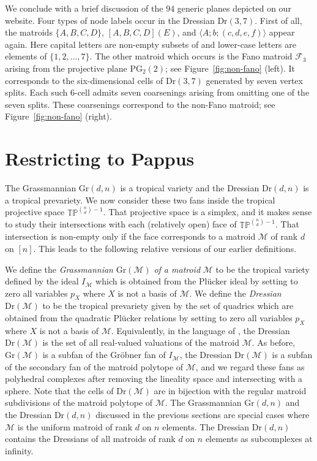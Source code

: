 \documentclass[12pt,a4paper]{amsart}
\theoremstyle{definition}
\newcommand{\PG}{{\mathrm{PG}}}
\newcommand{\Gr}{{\mathrm{Gr}}}
\newcommand{\Dr}{{\mathrm{Dr}}}
\newcommand{\TP}{{\mathbb{TP}}}
\providecommand\cF{{\mathscr{F}}}
\providecommand\cM{{\mathscr{M}}}
\begin{document}
We conclude with a brief discussion of the $94$ generic planes
depicted on our website.  Four types of node labels occur in the
Dressian $\Dr(3,7)$.  First of all, the matroids $\{A,B,C,D\}$,
$[A,B,C,D](E)$, and $\langle A;b;(c,d,e,f)\rangle$ appear again.  Here
capital letters are non-empty subsets of and lower-case letters are
elements of $\{1,2,\ldots,7\}$.  The other matroid which occurs is the
Fano matroid $\cF_3$ arising from the projective plane $\PG_2(2)$; see
Figure~\ref{fig:non-fano} (left).  It corresponds to the
six-dimensional cells of $\Dr(3,7)$ generated by seven vertex splits.
Each such $6$-cell admits seven coarsenings arising from omitting one
of the seven splits.  These coarsenings correspond to the non-Fano
matroid; see Figure~\ref{fig:non-fano} (right).

\section{Restricting to Pappus}
\label{sec:pappus}

The Grassmannian $\Gr(d,n)$ is a tropical variety and the Dressian
$\Dr(d,n)$ is a tropical prevariety.  We now consider these two fans
inside the tropical projective space $\TP^{\binom{n}{d}-1}$.  That
projective space is a simplex, and it makes sense to study their
intersections with each (relatively open) face of
$\TP^{\binom{n}{d}-1}$. That intersection is non-empty only if the
face corresponds to a matroid $\cM$ of rank $d$ on $[n]$. This leads
to the following relative versions of our earlier definitions.

We define the
\emph{Grassmannian} $\Gr(\cM)$ \emph{of a matroid} $\cM$ 
to be the tropical variety
defined by the ideal $I_\cM$ which is obtained from the Pl\"ucker
ideal by setting to zero all variables $p_X$ where $X$ is not a basis of $\cM$.  We define the \emph{Dressian} $\Dr(\cM)$ to be
the tropical prevariety given
by the set of quadrics which are obtained from the quadratic Pl\"ucker
relations by setting to zero all variables $p_X$ where $X$ is not a basis of $\cM$.  Equivalently, in the language of \cite{DW1,DW2}, the
Dressian $\Dr(\cM)$ is the set of all real-valued valuations of the
matroid $\cM$.  As before, $\Gr(\cM)$ is a subfan of the Gr\"obner fan
of $I_\cM$, the Dressian $\Dr(\cM)$ is a subfan of the secondary fan
of the matroid polytope of $\cM$, and we regard these fans as polyhedral
complexes after removing the lineality space and intersecting with a sphere.
Note that the cells of
$\Dr(\cM)$ are in bijection with the regular matroid subdivisions of
the matroid polytope of $\cM$.  The Grassmannian $\Gr(d,n)$ and the
Dressian $\Dr(d,n)$ discussed in the previous sections are special
cases where $\cM$ is the uniform matroid of rank $d$ on $n$ elements.
The Dressian $\Dr(d,n)$ contains the Dressians of all matroids of rank
$d$ on $n$ elements as subcomplexes at infinity.
\end{document}
